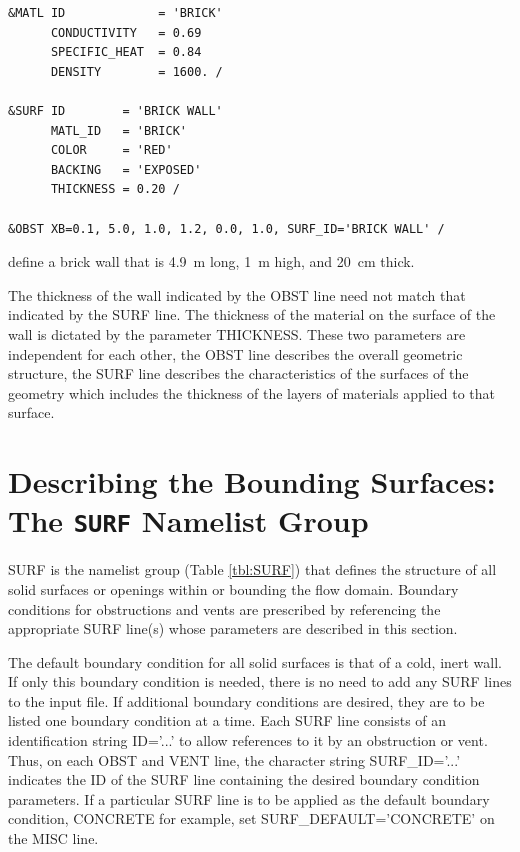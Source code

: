 \documentclass[11pt]{book}
\begin{document}
\footnotesize
\begin{verbatim}
&MATL ID             = 'BRICK'
      CONDUCTIVITY   = 0.69
      SPECIFIC_HEAT  = 0.84
      DENSITY        = 1600. /

&SURF ID        = 'BRICK WALL'
      MATL_ID   = 'BRICK'
      COLOR     = 'RED'
      BACKING   = 'EXPOSED'
      THICKNESS = 0.20 /

&OBST XB=0.1, 5.0, 1.0, 1.2, 0.0, 1.0, SURF_ID='BRICK WALL' /
\end{verbatim}
\normalsize

\noindent
define a brick wall that is 4.9~m long, 1~m high, and 20~cm thick.
\begin{warning}
\noindent
The thickness of the wall indicated by the {\ct OBST} line need not
match that indicated by the {\ct SURF} line. The thickness of the material on the surface of the wall
is dictated by the parameter {\ct THICKNESS}.  These two parameters are independent for each other,
the {\ct OBST} line describes the overall geometric structure, the {\ct SURF} line describes the
characteristics of the surfaces of the geometry which includes the thickness of the layers of
materials applied to that surface.
\end{warning}


\section{Describing the Bounding Surfaces: The \texorpdfstring{{\tt SURF}}{SURF} Namelist Group}
\label{info:SURF}

{\ct SURF} is the namelist group (Table \ref{tbl:SURF}) that defines
the structure of all solid surfaces or openings within or
bounding the flow domain. Boundary conditions for obstructions and vents are
prescribed by referencing the appropriate {\ct SURF} line(s) whose
parameters are described in this section.

The default boundary condition for all solid surfaces is that of a
cold, inert wall. If only this
boundary condition is needed, there is no need to add any {\ct SURF} lines
to the input file. If additional boundary conditions are desired,
they are to be listed one boundary condition at a time.
Each {\ct SURF} line consists of an identification string {\ct ID='...'} to
allow references to it by an obstruction or vent. Thus, on each
{\ct OBST} and {\ct VENT} line, the character string {\ct SURF\_ID='...'}
indicates the {\ct ID} of the {\ct SURF} line containing the desired boundary
condition parameters. If a particular {\ct SURF} line is to be applied
as the default boundary condition, {\ct CONCRETE} for example,
set {\ct SURF\_DEFAULT='CONCRETE'} on the {\ct MISC} line.
\end{document}
